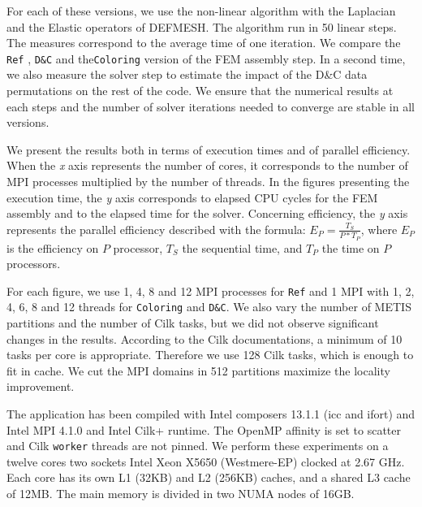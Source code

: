 \documentclass[10pt]{IOS-Book-Article}
\begin{document}
For each of these versions, we use the non-linear algorithm with the Laplacian and the Elastic operators of DEFMESH.
The algorithm run in 50 linear steps.
The measures correspond to the average time of one iteration.
We compare the  {\tt Ref} , {\tt D\&C} and the{\tt Coloring} version of the FEM assembly step.
In a second time, we also measure the solver step to estimate the impact of the D\&C data permutations on the rest of the code.
We ensure that the numerical results at each steps and the number of solver iterations needed to converge are stable in all versions.

We present the results both in terms of execution times and of parallel efficiency.
When the \emph{x} axis represents the number of cores, it corresponds to the number of MPI processes multiplied by the number of threads.
In the figures presenting the execution time, the \emph{y} axis corresponds to elapsed CPU cycles for the FEM assembly and to the elapsed time for the solver.
Concerning efficiency, the \emph{y} axis represents the parallel efficiency described with the formula:
$E_{P} = \frac{T_{S}}{P*T_{P}}$, where $E_{P}$ is the efficiency on $P$ processor, $T_{S}$ the sequential time, and $T_{P}$ the time on $P$ processors.

For each figure, we use 1, 4, 8 and 12 MPI processes for {\tt Ref} and 1 MPI with 1, 2, 4, 6, 8 and 12 threads for {\tt Coloring} and {\tt D\&C}.
We also vary the number of METIS partitions and the number of Cilk tasks, but we did not observe significant changes in the results.
According to the Cilk documentations, a minimum of 10 tasks per core is appropriate.
Therefore we use 128 Cilk tasks, which is enough to fit in cache.
We cut the MPI domains in 512 partitions maximize the locality improvement.

The application has been compiled with Intel composers 13.1.1 (icc and ifort) and Intel MPI 4.1.0 and Intel Cilk+ runtime.
The OpenMP affinity is set to scatter and Cilk {\tt worker} threads are not pinned.
We perform these experiments on a twelve cores two sockets Intel Xeon X5650 (Westmere-EP) clocked at 2.67 GHz.
Each core has its own L1 (32KB) and L2 (256KB) caches, and a shared L3 cache of 12MB. The main memory is divided in two NUMA nodes of 16GB.
\end{document}
